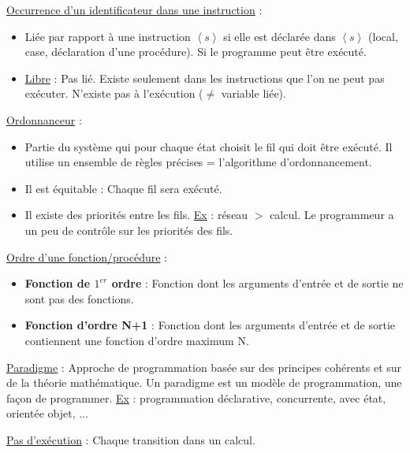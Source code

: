 \documentclass[fr,license=none]{../../../eplsummary}
\begin{document}
\begin{flushleft}
\textcolor{mauvedef}{\underline{Occurrence d’un identificateur dans une instruction}} :

\begin{itemize}
\item Liée par rapport à une instruction \textcolor{miorangerouge}{$\left\langle s \right\rangle$} si elle est déclarée dans \textcolor{miorangerouge}{$\left\langle s \right\rangle$} (local, case, déclaration d’une procédure). Si le programme peut être exécuté.
\item \underline{Libre} : Pas lié. Existe seulement dans les instructions que l’on ne peut pas exécuter.  N’existe pas à l’exécution ($\ne$ variable liée).
\end{itemize} \bigbreak



\textcolor{mauvedef}{\underline{Ordonnanceur}} :

\begin{itemize}
\item Partie du système qui pour chaque état choisit le fil qui doit être exécuté. Il utilise un ensemble de règles précises = l’algorithme d’ordonnancement.
\item Il est équitable : Chaque fil sera exécuté.
\item Il existe des priorités entre les fils. \underline{Ex} : réseau $>$ calcul. Le programmeur a un peu de contrôle sur les priorités des fils.
\end{itemize} \bigbreak


\textcolor{mauvedef}{\underline{Ordre d'une fonction/procédure}} :

\begin{itemize}
\item \textbf{Fonction de $1^{er}$ ordre} : Fonction dont les arguments d'entrée et de sortie ne sont pas des fonctions.
\item \textbf{Fonction d'ordre N+1} : Fonction dont les arguments d'entrée et de sortie contiennent une fonction d'ordre maximum N.
\end{itemize} \bigbreak


\textcolor{mauvedef}{\underline{Paradigme}} : Approche de programmation basée sur des principes cohérents et sur de la théorie mathématique. Un paradigme est un modèle de programmation, une façon de programmer. \underline{Ex} : programmation déclarative, concurrente, avec état, orientée objet, ...\bigbreak




\textcolor{mauvedef}{\underline{Pas d’exécution}} : Chaque transition dans un calcul. \bigbreak


\end{flushleft}
\end{document}
